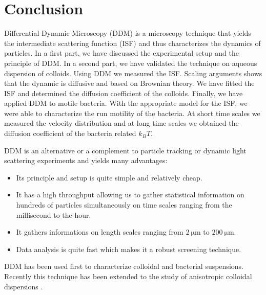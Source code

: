 \documentclass[%
 aip,
 jmp,%
 amsmath,amssymb,
reprint,%
]{revtex4-1}
\begin{document}
\section{\label{sec:leve4}Conclusion}

Differential Dynamic Microscopy (DDM) is a microscopy technique that yields the intermediate scattering function (ISF) and thus characterizes the dynamics of particles. In a first part, we have discussed the experimental setup and the principle of DDM. In a second part, we have validated the technique on aqueous dispersion of colloids. Using DDM we measured the ISF. Scaling arguments shows that the dynamic is diffusive and based on Brownian theory. We have fitted the ISF and determined the diffusion coefficient of the colloids. Finally, we have applied DDM to motile bacteria. With the appropriate model for the ISF, we were able to characterize the run motility of the bacteria. At short time scales we measured the velocity distribution and at long time scales we obtained the diffusion coefficient of the bacteria related $k_BT$.

DDM is an alternative or a complement to particle tracking \citep{7_jaqaman2008robust} or dynamic light scattering experiments and yields many advantages:

\begin{itemize}
\item Its principle and setup is quite simple and relatively cheap.
\item It has a high throughput allowing us to gather statistical information on hundreds of particles simultaneously on time scales ranging from the millisecond to the hour.
\item It gathers informations on length scales ranging from $\SI{2}{\micro\meter}$ to $\SI{200}{\micro\meter}$.
\item Data analysis is quite fast which makes it a robust screening technique.
\end{itemize}

DDM has been used first to characterize colloidal and bacterial suspensions. Recently this technique has been extended to the study of anisotropic colloidal dispersions \citep{20_reufer2012differential}.
\end{document}
